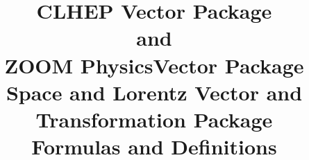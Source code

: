 
\flushbottom
\pagestyle{headings}

\setlength{\topmargin}{0.0in}
\setlength{\textwidth}{5.5in}
\setlength{\oddsidemargin}{.5in}
\setlength{\evensidemargin}{.5in}
\setlength{\textheight}{8.5in}

\addtolength{\parskip}{2pt}

\newcommand{\fpcl}{{\sc fpcl}}

\def \Point {{\tt Point3D}}
\def \Line {{\tt Line3D}}
\def \Direction {{\tt Direction}}
\def \UnitVector {{\tt UnitVector}}
\def \Plane {{\tt Plane3D}}
\def \SpaceVector {{\tt SpaceVector}}
\def \SV {{\tt Hep3Vector}}
\def \SVz {{\tt SpaceVector}}
\def \UV {{\tt UnitVector}}
\def \TangentVector {{\tt TangentVector}}
\def \TV {{\tt TangentVector}}
\def \Ro {{\tt HepRotation}}
\def \Ros {{\tt Rotation}}
\def \Rotation {{\tt Rotation}}
\def \RotationZ {{\tt HepRotationZ}}
\def \Transformation {{\tt Transformation}}
\def \Euclidean {{\tt EuclideanTransformation}}
\def \Angle {{\tt Angle}}
\def \LorentzVector {{\tt LorentzVector}}
\def \LorentzTransformation {{\tt LorentzTransformation}}
\def \LV {{\tt HepLorentzVector}}
\def \LVz {{\tt LorentzVector}}
\def \LT {{\tt HepLorentzRotation}}
\def \LTs {{\tt LorentzTransformation}}
\def \LB {{\tt HepBoost}}
\def \LBs {{\tt LorentzBoost}}
\def \PolarAngle {{\tt PolarAngle}}
\def \PAngle {{\tt PAngle}}
\def \AzimuthalAngle {{\tt AzimuthalAngle}}
\def \AAngle {{\tt AAngle}}
\def \EB {{\tt EBvector}}
\def \AV {{\tt Adjoint3Vector}}
\def \ALV {{\tt Adjoint4Vector}}
\def \Scalar {{\tt Scalar}}
\def \Ax {{\tt HepAxisAngle}}
\def \Es {{\tt HepEulerAngles}}

\newcommand {\see}[1] {\hfill$\triangleright$ see eqn.~#1}

\newenvironment{shortlist}{%
\begin{itemize}
\setlength{\itemsep}{0pt}
\setlength{\parskip}{0pt}
}{%
\end{itemize}
}

\setcounter{secnumdepth}{2}	%
\setcounter{tocdepth}{2}	%



\title{CLHEP {\bf Vector} Package \\ 
and \\
ZOOM {\bf PhysicsVector} Package \\
Space and Lorentz Vector and Transformation Package \\
Formulas and Definitions}

